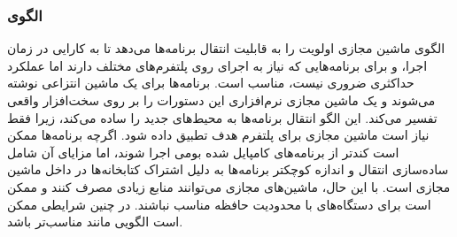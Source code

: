 \subsubsection{الگوی }
\label{archVirtMachineSec}
\begin{RTL}
الگوی ماشین مجازی اولویت را به قابلیت انتقال برنامه‌ها می‌دهد تا به کارایی
در زمان اجرا، و برای برنامه‌هایی که نیاز به اجرای روی پلتفرم‌های مختلف
دارند اما عملکرد حداکثری ضروری نیست، مناسب است.
برنامه‌ها برای یک ماشین انتزاعی نوشته می‌شوند و یک ماشین مجازی
نرم‌افزاری این دستورات را بر روی سخت‌افزار واقعی تفسیر می‌کند.
این الگو انتقال برنامه‌ها به محیط‌های جدید را ساده می‌کند،
زیرا فقط نیاز است ماشین مجازی برای پلتفرم هدف تطبیق داده شود.
اگرچه برنامه‌ها ممکن است کندتر از برنامه‌های کامپایل شده بومی اجرا
شوند، اما مزایای آن شامل ساده‌سازی انتقال و اندازه کوچکتر برنامه‌ها به
دلیل اشتراک کتابخانه‌ها در داخل ماشین مجازی است. با این حال، ماشین‌های
مجازی می‌توانند منابع زیادی مصرف کنند و ممکن است برای دستگاه‌های با
محدودیت حافظه مناسب نباشند. در چنین شرایطی ممکن است الگویی مانند
مناسب‌تر باشد.
\end{RTL}